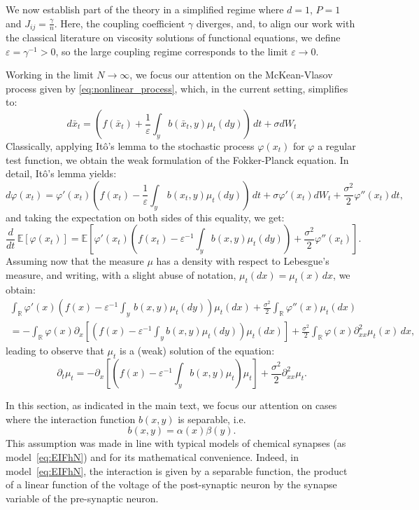 \documentclass[onefignum,onetabnum]{siamart190516}
\newcommand{\R}{\mathbb{R}}
\newcommand{\1}{\mathbbm{1}}
\newcommand{\Ee}{\mathbb{E}}
\newcommand{\eps}{\varepsilon}
\newcommand{\review}[1]{\textcolor{midblue}{ #1}}
\renewcommand{\review}[1]{{ #1}}
\begin{document}
We now establish part of the theory in a simplified regime where $d=1$, $P=1$ and $J_{ij}=\frac{\gamma}{n}$. Here, the coupling coefficient $\gamma$ diverges, and, to align our work with the classical literature on viscosity solutions of functional equations, we define $\eps=\gamma^{-1}>0$, so the large coupling regime corresponds to the limit  $\eps\to 0$. 

Working in the limit $N\to \infty$, we focus our attention on the McKean-Vlasov process given by \eqref{eq:nonlinear_process}, which, in the current setting, simplifies to:
\begin{equation*}
d\bar{x}_t = \left(f(\bar x_t) + \frac 1 \eps \int_{y} b(\bar x_t,y)\mu_t(dy) \right)\,dt+ \sigma dW_t
\end{equation*}
Classically, applying It\^o's lemma to the stochastic process $\varphi(x_t)$ for $\varphi$ a regular test function, we obtain the weak formulation of the Fokker-Planck equation. In detail, It\^o's lemma yields:
$$
d\varphi(x_t) = \varphi'(x_t)\left(f(x_t)- \frac 1 \eps \int_{y}\,b(x_t,y)\mu_t(dy) \right)\,dt+\sigma\varphi'(x_t)dW_t+\frac{\sigma^2}{2}\varphi''(x_t)dt,
$$
and taking the expectation on both sides of this equality, we get:
$$
\frac{d}{dt}\,\Ee[\varphi(x_t)] = \Ee\left[\varphi'(x_t)\left(f(x_t)- \eps^{-1}\int_{y} b(x,y)\mu_t(dy) \right)+\frac{\sigma^2}{2}\varphi''(x_t)\right].
$$
Assuming now that the measure $\mu$ has a density with respect to Lebesgue's measure, and writing, with a slight abuse of notation, $\mu_t(dx)=\mu_t(x)\,dx$, we obtain:
\begin{multline*}
 \int_\R \varphi'(x)\left(f(x)- \eps^{-1}\int_{y} \,b(x,y)\mu_t(dy) \right)\mu_t(dx)+\frac{\sigma^2}{2}\int_\R\varphi''(x) \mu_t(dx)
 \\
 =-\int_\R \varphi(x)\partial_x\left[\left(f(x)- \eps^{-1}\int_{y} b(x,y)\mu_t(dy) \right)\mu_t(dx)\right]+\frac{\sigma^2}{2}\int_\R\varphi(x) \partial^2_{xx}\mu_t(x)\,dx,
\end{multline*}
leading to observe that $\mu_t$ is a (weak) solution of the equation:
\begin{equation}\label{eq:pde}
\partial_t\mu_t = -\partial_x\left[\left(f(x)- \eps^{-1}\int_{y} b(x,y)\mu_t \right)\mu_t\right]+\frac{\sigma^2}{2}\partial^2_{xx}\mu_t.
\end{equation}

In this section, as indicated in the main text, we focus our attention on cases where the interaction function $b(x,y)$ is separable, i.e.
$$
b(x,y) = \alpha(x)\beta(y).
$$
\review{This assumption was made in line with typical models of chemical synapses (as model~\eqref{eq:EIFhN}) and for its mathematical convenience. Indeed, in model~\eqref{eq:EIFhN}, the interaction is given by a separable function, the product of a linear function of the voltage of the post-synaptic neuron by the synapse variable of the pre-synaptic neuron.
}
\end{document}
